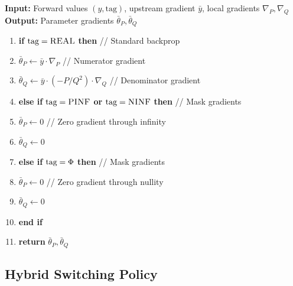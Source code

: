 \documentclass[twoside,11pt]{article}
\newcommand{\trReal}{\textsc{REAL}}
\newcommand{\trPINF}{\textsc{PINF}}
\newcommand{\trNINF}{\textsc{NINF}}
\newcommand{\trPHI}{\textsc{$\Phi$}}
\newcommand{\TAGREAL}{\trReal}
\newcommand{\TAGPINF}{\trPINF}
\newcommand{\TAGNINF}{\trNINF}
\newcommand{\TAGPHI}{\trPHI}
\begin{document}
\begin{tcolorbox}[colback=gray!5!white,colframe=gray!75!black,title=\textbf{Algorithm \refstepcounter{algctr}\thealgctr: Mask-REAL Gradient Computation}]
\label{alg:mask-real-grad}
\textbf{Input:} Forward values $(y, \text{tag})$, upstream gradient $\bar{y}$, local gradients $\nabla_P, \nabla_Q$ \\
\textbf{Output:} Parameter gradients $\bar{\theta}_P, \bar{\theta}_Q$

\begin{enumerate}
\item \textbf{if} $\text{tag} = \TAGREAL$ \textbf{then} \hfill // Standard backprop
\item \quad $\bar{\theta}_P \leftarrow \bar{y} \cdot \nabla_P$ \hfill // Numerator gradient
\item \quad $\bar{\theta}_Q \leftarrow \bar{y} \cdot (-P/Q^2) \cdot \nabla_Q$ \hfill // Denominator gradient
\item \textbf{else if} $\text{tag} = \TAGPINF$ \textbf{or} $\text{tag} = \TAGNINF$ \textbf{then} \hfill // Mask gradients
\item \quad $\bar{\theta}_P \leftarrow 0$ \hfill // Zero gradient through infinity
\item \quad $\bar{\theta}_Q \leftarrow 0$
\item \textbf{else if} $\text{tag} = \TAGPHI$ \textbf{then} \hfill // Mask gradients  
\item \quad $\bar{\theta}_P \leftarrow 0$ \hfill // Zero gradient through nullity
\item \quad $\bar{\theta}_Q \leftarrow 0$
\item \textbf{end if}
\item \textbf{return} $\bar{\theta}_P, \bar{\theta}_Q$
\end{enumerate}
\end{tcolorbox}

\subsection{Hybrid Switching Policy}
\end{document}

